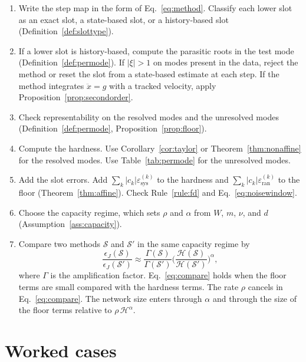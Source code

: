 \documentclass[11pt]{article}
\theoremstyle{definition}
\theoremstyle{remark}
\newcommand{\Meth}{\mathcal{S}}          %
\newcommand{\Hard}{\mathcal{H}}          %
\newcommand{\sys}{\mathrm{sys}}
\newcommand{\ran}{\mathrm{ran}}
\begin{document}
\begin{enumerate}[label=\arabic*.]
\item Write the step map in the form of Eq.~\eqref{eq:method}.
Classify each lower slot as an exact slot, a state-based slot, or a history-based slot (Definition~\ref{def:slottype}).
\item If a lower slot is history-based, compute the parasitic roots in the test mode (Definition~\ref{def:permode}).
If $|\xi| > 1$ on modes present in the data, reject the method or reset the slot from a state-based estimate at each step.
If the method integrates $\ddot x = g$ with a tracked velocity, apply Proposition~\ref{prop:secondorder}.
\item Check representability on the resolved modes and the unresolved modes (Definition~\ref{def:permode}, Proposition~\ref{prop:floor}).
\item Compute the hardness.
Use Corollary~\ref{cor:taylor} or Theorem~\ref{thm:nonaffine} for the resolved modes.
Use Table~\ref{tab:permode} for the unresolved modes.
\item Add the slot errors.
Add $\sum_k |c_k| \varepsilon^{(k)}_\sys$ to the hardness and $\sum_k |c_k|\varepsilon^{(k)}_\ran$ to the floor (Theorem~\ref{thm:affine}).
Check Rule~\ref{rule:fd} and Eq.~\eqref{eq:noisewindow}.
\item Choose the capacity regime, which sets $\rho$ and $\alpha$ from $W$, $m$, $\nu$, and $d$ (Assumption~\ref{ass:capacity}).
\item Compare two methods $\Meth$ and $\Meth'$ in the same capacity regime by
\begin{equation}\label{eq:compare}
\frac{\epsilon_J(\Meth)}{\epsilon_J(\Meth')} \approx \frac{\Gamma(\Meth)}{\Gamma(\Meth')}\Big(\frac{\Hard(\Meth)}{\Hard(\Meth')}\Big)^{\alpha},
\end{equation}
where $\Gamma$ is the amplification factor.
Eq.~\eqref{eq:compare} holds when the floor terms are small compared with the hardness terms.
The rate $\rho$ cancels in Eq.~\eqref{eq:compare}.
The network size enters through $\alpha$ and through the size of the floor terms relative to $\rho\,\Hard^\alpha$.
\end{enumerate}

\section{Worked cases}\label{sec:cases}
\end{document}
